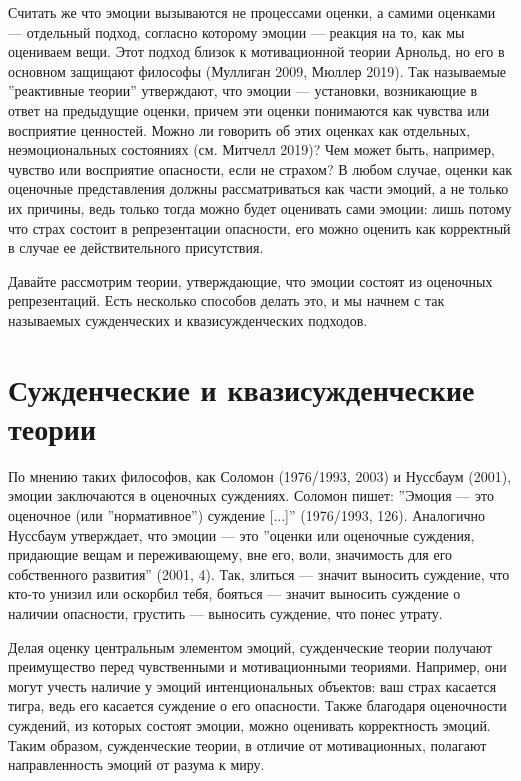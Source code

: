 \documentclass[11pt]{book}
\begin{document}
Считать же что эмоции вызываются не процессами оценки, а самими оценками --- отдельный подход, согласно которому эмоции --- реакция на то, как мы оцениваем вещи. Этот подход близок к мотивационной теории Арнольд, но его в основном защищают философы (Муллиган 2009, Мюллер 2019). Так называемые ''реактивные теории'' утверждают, что эмоции --- установки, возникающие в ответ на предыдущие оценки, причем эти оценки понимаются как чувства или восприятие ценностей. Можно ли говорить об этих оценках как отдельных, неэмоциональных состояниях (см. Митчелл 2019)? Чем может быть, например, чувство или восприятие опасности, если не страхом? В любом случае, оценки как оценочные представления должны рассматриваться как части эмоций, а не только их причины, ведь только тогда можно будет оценивать сами эмоции: лишь потому что страх состоит в репрезентации опасности, его можно оценить как корректный в случае ее действительного присутствия.

Давайте рассмотрим теории, утверждающие, что эмоции состоят из оценочных репрезентаций. Есть несколько способов делать это, и мы начнем с так называемых сужденческих и квазисужденческих подходов.

\section{Сужденческие и квазисужденческие теории}

По мнению таких философов, как Соломон (1976/1993, 2003) и Нуссбаум (2001), эмоции заключаются в оценочных суждениях. Соломон пишет: ''Эмоция --- это оценочное (или ''нормативное'') суждение [...]'' (1976/1993, 126). Аналогично Нуссбаум утверждает, что эмоции --- это ''оценки или оценочные суждения, придающие вещам и переживающему, вне его, воли, значимость для его собственного развития'' (2001, 4). Так, злиться --- значит выносить суждение, что кто-то унизил или оскорбил тебя, бояться --- значит выносить суждение о наличии опасности, грустить --- выносить суждение, что понес утрату.

Делая оценку центральным элементом эмоций, сужденческие теории получают преимущество перед чувственными и мотивационными теориями. Например, они могут учесть наличие у эмоций интенциональных объектов: ваш страх касается тигра, ведь его касается суждение о его опасности. Также благодаря оценочности суждений, из которых состоят эмоции, можно оценивать корректность эмоций. Таким образом, сужденческие теории, в отличие от мотивационных, полагают направленность эмоций от разума к миру.
\end{document}
